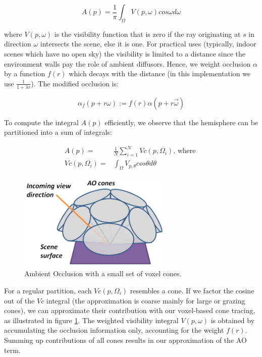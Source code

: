 \begin{equation*}
	A(p)=\frac{1}{\pi}\int_\Omega V(p,\omega)cos\omega d\omega
\end{equation*}

where $V(p,\omega)$ is the visibility function that is zero if the ray originating at $s$ in direction $\omega$ intersects the scene, else it is one. For practical uses (typically, indoor scenes which have no open sky) the visibility is limited to a distance since the environment walls pay the role of ambient diffusors. Hence, we weight occlusion $\alpha$ by a function $f(r)$ which decays with the distance (in this implementation we use $\frac{1}{1+\lambda r}$). The modified occlusion is:

\begin{equation*}
	\alpha_f(p+r\omega):=f(r)\alpha(p+r\vec{\omega})
\end{equation*}

To compute the integral $A(p)$ efficiently, we observe that the hemisphere can be partitioned into a sum of integrals: 

\begin{equation*}
\begin{aligned}
	A(p)=&\frac{1}{N}\sum^{N}_{i=1}Vc(p,\Omega_i)\text{, where }\\
	Vc(p,\Omega_i)=&\int_{\Omega}V_{p,\theta}cos\theta d\theta
\end{aligned}
\end{equation*}

\begin{figure}
\sidecaption
	\includegraphics[width=0.65\textwidth]{graphics/vct/vct-14-1}
	\caption{Ambient Occlusion with a small set of voxel cones.}
	\label{f:vct-ao}
\end{figure}

For a regular partition, each $Vc(p,\Omega_i)$ resembles a cone. If  we factor the cosine out of the $Vc$ integral (the approximation is coarse mainly for large or grazing cones), we can approximate their contribution with our voxel-based cone tracing, as illustrated in figure \ref{f:vct-ao}. The weighted visibility integral $V(p,\omega)$ is obtained by accumulating the occlusion information only, accounting for the weight $f(r)$. Summing up contributions of all cones results in our approximation of the AO term.




